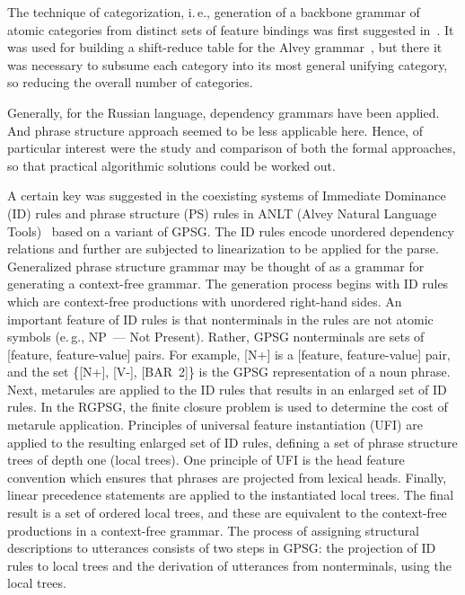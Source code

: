 \begin{multicols}{2}
     The technique of categorization, i.\,e., generation of a backbone grammar of 
atomic categories from distinct sets of feature bindings was first suggested 
in~\cite{14-koz}. It was used for building a shift-reduce table for the Alvey 
grammar~\cite{5-koz}, but there it was necessary to subsume each category into 
its most general unifying category, so reducing the overall number of categories.
     
     Generally, for the Russian language, dependency grammars have been 
applied. And phrase structure approach seemed to be less applicable here. Hence, 
of particular interest were the study and comparison of both the formal 
approaches, so that practical algorithmic solutions could be worked out. 
     
     A certain key was suggested in the coexisting systems of Immediate 
Dominance (ID) rules and phrase structure (PS) rules in ANLT 
(Alvey Natural Language Tools)~\cite{5-koz} based 
on a variant of GPSG. The ID rules encode unordered dependency relations and 
further are subjected to linearization to be applied for the parse. Generalized
phrase structure grammar may be 
thought of as a grammar for generating a context-free grammar. The generation 
process begins with ID rules which are context-free 
productions with unordered right-hand sides. An important feature of ID rules is 
that nonterminals in the rules are not atomic symbols (e.\,g., NP~---
Not Present). Rather, GPSG 
nonterminals are sets of [feature, feature-value] pairs. For example, [N+] is a 
[feature, feature-value] pair, and the set \{[N+], [V-], [BAR~2]\} is the GPSG 
representation of a noun phrase. Next, metarules are applied to the ID rules
that results in 
an enlarged set of ID rules. In the RGPSG, the finite closure problem is used to 
determine the cost of metarule application. Principles of universal feature 
instantiation (UFI) are applied to the resulting enlarged set of ID rules, defining a set of 
phrase structure trees of depth one (local trees). One principle of UFI is the head 
feature convention which ensures that phrases are projected from lexical heads. 
Finally, linear precedence statements are applied to the instantiated local trees. The 
final result is a set of ordered local trees, and these are equivalent to the 
     context-free productions in a context-free grammar. The process of assigning 
structural descriptions to utterances consists of two steps in GPSG: the projection 
of ID rules to local trees and the derivation of utterances from nonterminals, using 
the local trees. 
     

\end{multicols}
